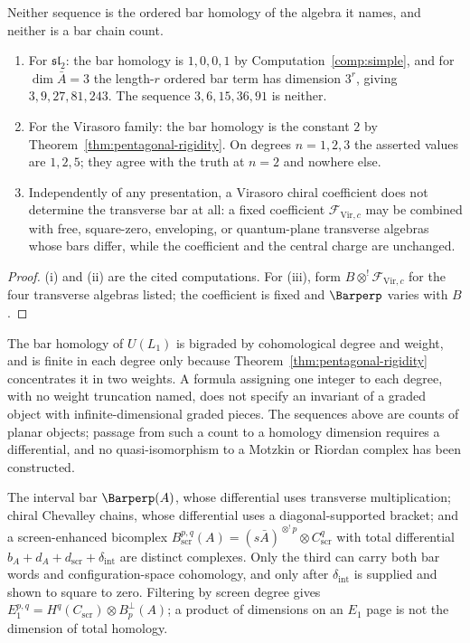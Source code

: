 \begin{theorem}
\label{thm:exact-audit}
\StatusComputed{} Neither sequence is the ordered bar homology of the
algebra it names, and neither is a bar chain count.
\begin{enumerate}
\item For $\mathfrak{sl}_2$: the bar homology is $1,0,0,1$ by
  Computation~\ref{comp:simple}, and for $\dim\bar A = 3$ the length-$r$
  ordered bar term has dimension $3^r$, giving $3,9,27,81,243$. The
  sequence $3,6,15,36,91$ is neither.
\item For the Virasoro family: the bar homology is the constant $2$ by
  Theorem~\ref{thm:pentagonal-rigidity}. On degrees $n=1,2,3$ the asserted
  values are $1,2,5$; they agree with the truth at $n=2$ and nowhere else.
\item Independently of any presentation, a Virasoro chiral coefficient
  does not determine the transverse bar at all: a fixed coefficient
  $\mathcal F_{\mathrm{Vir},c}$ may be combined with free, square-zero,
  enveloping, or quantum-plane transverse algebras whose bars differ,
  while the coefficient and the central charge are unchanged.
\end{enumerate}
\end{theorem}

\begin{proof}
(i) and (ii) are the cited computations. For (iii), form $B\otimes^!
\mathcal F_{\mathrm{Vir},c}$ for the four transverse algebras listed; the
coefficient is fixed and $\Barperp$ varies with $B$.
\end{proof}

\begin{remark}
\label{rem:type-error}
The bar homology of $U(L_1)$ is bigraded by cohomological degree and
weight, and is finite in each degree only because
Theorem~\ref{thm:pentagonal-rigidity} concentrates it in two weights. A
formula assigning one integer to each degree, with no weight truncation
named, does not specify an invariant of a graded object with
infinite-dimensional graded pieces. The sequences above are counts of
planar objects; passage from such a count to a homology dimension requires
a differential, and no quasi-isomorphism to a Motzkin or Riordan complex
has been constructed.
\end{remark}

\begin{remark}
\label{rem:three-models}
The interval bar $\Barperp(A)$, whose
differential uses transverse multiplication; chiral Chevalley chains,
whose differential uses a diagonal-supported bracket; and a
screen-enhanced bicomplex $B^{p,q}_{\mathrm{scr}}(A) = (s\bar
A)^{\otimes^! p}\otimes C^q_{\mathrm{scr}}$ with total differential
$b_A+d_A+d_{\mathrm{scr}}+\delta_{\mathrm{int}}$ are distinct complexes.
Only the third can carry both bar words and
configuration-space cohomology, and only after
$\delta_{\mathrm{int}}$ is supplied and shown to square to zero. Filtering
by screen degree gives $E_1^{p,q} = H^q(C_{\mathrm{scr}})\otimes
B^\perp_p(A)$; a product of dimensions on an $E_1$ page is not the
dimension of total homology.
\end{remark}
